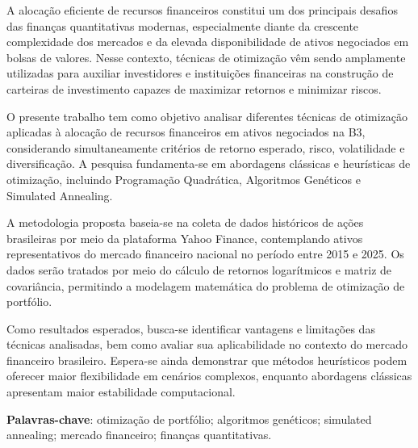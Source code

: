 \documentclass[
  12pt,
  oneside,
  a4paper,
  brazil
]{abntex2}
\begin{document}
\imprimircapa

\begin{resumo}
A alocação eficiente de recursos financeiros constitui um dos principais desafios das finanças quantitativas modernas, especialmente diante da crescente complexidade dos mercados e da elevada disponibilidade de ativos negociados em bolsas de valores. Nesse contexto, técnicas de otimização vêm sendo amplamente utilizadas para auxiliar investidores e instituições financeiras na construção de carteiras de investimento capazes de maximizar retornos e minimizar riscos.

O presente trabalho tem como objetivo analisar diferentes técnicas de otimização aplicadas à alocação de recursos financeiros em ativos negociados na B3, considerando simultaneamente critérios de retorno esperado, risco, volatilidade e diversificação. A pesquisa fundamenta-se em abordagens clássicas e heurísticas de otimização, incluindo Programação Quadrática, Algoritmos Genéticos e Simulated Annealing.

A metodologia proposta baseia-se na coleta de dados históricos de ações brasileiras por meio da plataforma Yahoo Finance, contemplando ativos representativos do mercado financeiro nacional no período entre 2015 e 2025. Os dados serão tratados por meio do cálculo de retornos logarítmicos e matriz de covariância, permitindo a modelagem matemática do problema de otimização de portfólio.

Como resultados esperados, busca-se identificar vantagens e limitações das técnicas analisadas, bem como avaliar sua aplicabilidade no contexto do mercado financeiro brasileiro. Espera-se ainda demonstrar que métodos heurísticos podem oferecer maior flexibilidade em cenários complexos, enquanto abordagens clássicas apresentam maior estabilidade computacional.

\textbf{Palavras-chave}: otimização de portfólio; algoritmos genéticos; simulated annealing; mercado financeiro; finanças quantitativas.
\end{resumo}
\end{document}
